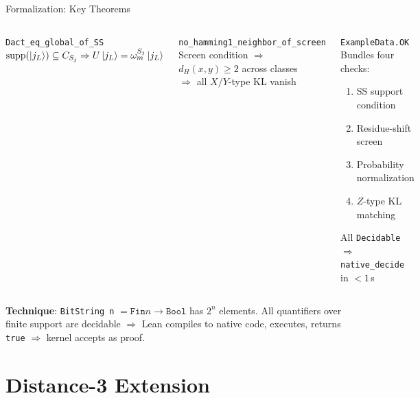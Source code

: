 \documentclass[aspectratio=169,t]{beamer}
\newcommand{\code}[1]{\texttt{\small #1}}
\begin{document}
\begin{frame}[fragile]{Formalization: Key Theorems}

\begin{columns}[T]
\begin{block}{\code{Dact\_eq\_global\_of\_SS}}
$\mathrm{supp}(\ket{j_L})\subseteq C_{S_j}
 \Rightarrow 
U\ket{j_L} = \omega_m^{S_j}\ket{j_L}$
\end{block}

\begin{block}{\code{no\_hamming1\_neighbor\_of\_screen}}
Screen condition $\Rightarrow$
$d_H(x,y)\geq 2$ across classes\\
$\Rightarrow$ all $X/Y$-type KL vanish
\end{block}

\begin{alertblock}{\code{ExampleData.OK}}
Bundles four checks:
\begin{enumerate}\setlength\itemsep{0pt}
\item SS support condition
\item Residue-shift screen
\item Probability normalization
\item $Z$-type KL matching
\end{enumerate}
All \code{Decidable} $\Rightarrow$\\
\code{native\_decide} in $<1$\,s
\end{alertblock}
\end{columns}

\vspace{0.5em}
\textbf{Technique}: \code{BitString n} $= \texttt{Fin} n \to \texttt{Bool}$ has $2^n$ elements.
All quantifiers over finite support are decidable $\Rightarrow$ 
Lean compiles to native code, executes, returns \code{true} $\Rightarrow$ kernel accepts as proof.
\end{frame}

\section{Distance-3 Extension}
\end{document}
